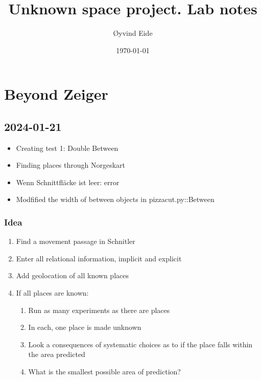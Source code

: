 \documentclass[12pt]{book}
\begin{document}
\title{Unknown space project. Lab notes}

\author{Øyvind Eide}

\date{\today}



\setlength{\parindent}{0cm}
\setlength{\parskip}{3mm}
\let\stdsection\section

\chapter{Beyond Zeiger}

\section{2024-01-21}

\begin{itemize}
\item Creating test 1: Double Between

\item Finding places through Norgeskart

\item Wenn Schnittfläcke ist leer: error

\item Modfified the width of between objects in pizzacut.py::Between

\end{itemize}

\subsection{Idea}

\begin{enumerate}
\item Find a movement passage in Schnitler
\item Enter all relational information, implicit and explicit
\item Add geolocation of all known places
\item If all places are known:
\begin{enumerate}
\item Run as many experiments as there are places
\item In each, one place is made unknown
\item Look a consequences of systematic choices as to if the place falls within the area predicted
\item What is the smallest possible area of prediction?
\end{enumerate}

\end{enumerate}
\end{document}
